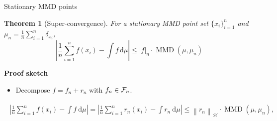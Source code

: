 \documentclass[aspectratio=169,xcolor=dvipsnames]{beamer}
\newenvironment{answer box}{%
    \begin{beamercolorbox}[wd=\linewidth, sep=0.33em, rounded=true]{answer box}%
}{%
    \end{beamercolorbox}%
}
\newtheorem{thm}{Theorem}
\begin{document}
\begin{frame}{Stationary MMD points}
    \begin{thm}[Super-convergence]
        For a stationary MMD point set $\{x_i\}_{i=1}^n$ and
        $\mu_n = \frac{1}{n} \sum_{i=1}^n\delta_{x_i}$,
        \vspace{-0.3cm}
        \[
            \left|\frac{1}{n}\sum_{i=1}^n f(x_i)-\int f\,\mathrm{d}\mu\right|
            \leq |f|_n \cdot \operatorname{MMD}\left(\mu, \mu_n\right)
        \]
    \end{thm}

    \vspace{0.35cm}
    \begin{answer box}
        {\centering\textbf{Proof sketch}\par}
        \begin{itemize}
            \item Decompose $f=f_n+r_n$ with $f_n\in\mathcal{F}_n$.
        \end{itemize}
        \begin{align*}
            \begin{aligned}
\left|\frac{1}{n} \sum_{i=1}^n f\left(x_i\right)-\int f \mathrm{~d} \mu\right|=\left|\frac{1}{n} \sum_{i=1}^n r_n\left(x_i\right)-\int r_n \mathrm{~d} \mu\right|
\leq\left\|r_n\right\|_{\mathcal{H}} \cdot \operatorname{MMD}\left(\mu, \mu_n\right),
\end{aligned}
    \end{align*}
    \vspace{-0.3cm}
    \end{answer box}
\end{frame}
\end{document}
